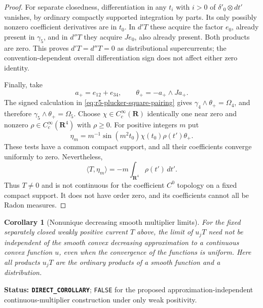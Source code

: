 \documentclass[11pt,a4paper]{article}
\numberwithin{equation}{section}
\newtheorem{corollary}[theorem]{Corollary}
\theoremstyle{definition}
\theoremstyle{remark}
\begin{document}
\begin{proof}
For separate closedness, differentiation in any $t_i$ with $i>0$
of $\delta'_0\otimes dt'$ vanishes, by ordinary compactly
supported integration by parts.  Its only possibly nonzero
coefficient derivatives are in $t_0$.  In $d'T$ these acquire
the factor $e_0$, already present in $\gamma_5$, and in $d''T$
they acquire $Je_0$, also already present.  Both products are
zero.  This proves $d'T=d''T=0$ as distributional supercurrents;
the convention-dependent overall differentiation sign does not
affect either zero identity.

Finally, take
\[
 a_+=e_{12}+e_{34},\qquad \theta_+=-a_+\wedge Ja_+.
\]
The signed calculation in
\eqref{eq:r5-plucker-square-pairing} gives
$\gamma_4\wedge\theta_+=\Omega_4$, and therefore
$\gamma_5\wedge\theta_+=\Omega_5$.
Choose $\chi\in C_c^\infty(\mathbf R)$ identically one near zero
and nonzero $\rho\in C_c^\infty(\mathbf R^4)$ with $\rho\ge0$.
For positive integers $m$ put
\[
 \eta_m=m^{-1}\sin(m^2t_0)\chi(t_0)\rho(t')\theta_+.
\]
These tests have a common compact support, and all their
coefficients converge uniformly to zero.  Nevertheless,
\[
                  \langle T,\eta_m\rangle
                     =-m\int_{\mathbf R^4}\rho(t')\,dt'.
\]
Thus $T\ne0$ and is not continuous for the coefficient $C^0$
topology on a fixed compact support.  It does not have order
zero, and its coefficients cannot all be Radon measures.
\end{proof}

\begin{corollary}[Nonunique decreasing smooth multiplier limits]
\label{cor:r5-tropical-multiplier-limit-false}
For the fixed separately closed weakly positive current $T$ above,
the limit of $u_jT$ need not be independent of the smooth convex
decreasing approximation to a continuous convex function $u$,
even when the convergence of the functions is uniform.  Here all
products $u_jT$ are the ordinary products of a smooth function
and a distribution.
\end{corollary}

\noindent\textbf{Status: \texttt{DIRECT\_COROLLARY}};
\texttt{FALSE} for the proposed approximation-independent
continuous-multiplier construction under only weak positivity.
\end{document}
